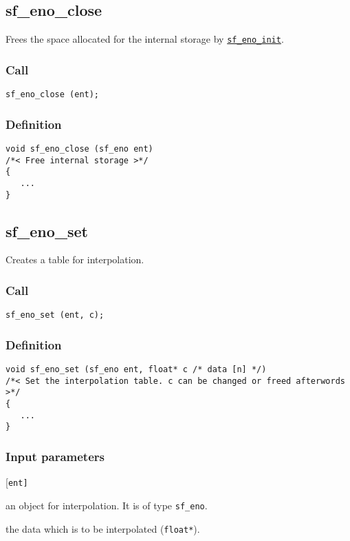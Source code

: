 \subsection{{sf\_eno\_close}}
Frees the space allocated for the internal storage by \hyperref[sec:sf_eno_init]{\texttt{sf\_eno\_init}}.

\subsubsection*{Call}
\begin{verbatim}sf_eno_close (ent);\end{verbatim}

\subsubsection*{Definition}
\begin{verbatim}
void sf_eno_close (sf_eno ent)
/*< Free internal storage >*/
{
   ...
}
\end{verbatim}




\subsection{{sf\_eno\_set}}
Creates a table for interpolation.

\subsubsection*{Call}
\begin{verbatim}sf_eno_set (ent, c);\end{verbatim}

\subsubsection*{Definition}
\begin{verbatim}
void sf_eno_set (sf_eno ent, float* c /* data [n] */)
/*< Set the interpolation table. c can be changed or freed afterwords >*/
{
   ...
}
\end{verbatim}

\subsubsection*{Input parameters}
\begin{desclist}{\tt }{\quad}[\tt ent]
   \setlength\itemsep{0pt}
   \item[ent] an object for interpolation. It is of type \texttt{sf\_eno}.
   \item[c]   the data which is to be interpolated (\texttt{float*}).  
\end{desclist}





